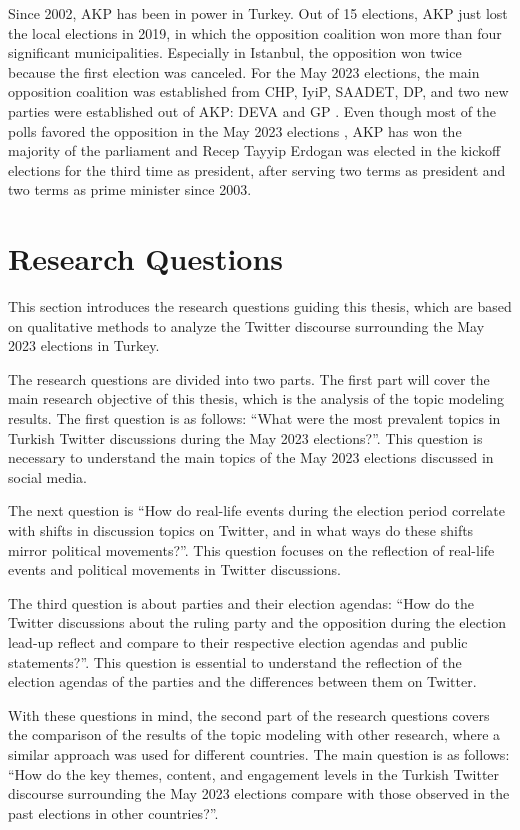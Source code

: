 Since 2002, \ac{AKP} has been in power in Turkey. Out of 15 elections, \ac{AKP} just lost the 
local elections in 2019, in which the opposition coalition won more than four significant municipalities. 
Especially in Istanbul, the opposition won twice because the first election was canceled. 
For the May 2023 elections, the main opposition coalition was established from \ac{CHP}, \ac{IyiP}, \ac{SAADET}, 
\ac{DP}, and two new parties were established out of \ac{AKP}: \ac{DEVA} and \ac{GP} 
\parencite{Atila_medyascope_tr_secim_tarihi_2022}. 
Even though most of the polls favored the opposition in the May 2023 elections 
\parencite{Saç_Çoban_teyit_anketler_2023}, \ac{AKP} has won the majority of the parliament and 
Recep Tayyip Erdogan was elected in the kickoff elections for the third time as president, after serving 
two terms as president and two terms as prime minister since 2003.
\section{Research Questions}

This section introduces the research questions guiding this thesis,
which are based on qualitative methods to analyze the Twitter discourse surrounding the May 2023 elections in Turkey.


The research questions are divided into two parts.
The first part will cover the main research objective of this thesis, 
which is the analysis of the topic modeling results. The first question is as follows:
``What were the most prevalent topics in Turkish Twitter discussions during the May 2023 elections?''.
This question is necessary to understand the main topics of the May 2023 elections discussed in social media.

The next question is ``How do real-life events during the election period correlate with shifts in discussion topics on Twitter, 
and in what ways do these shifts mirror political movements?''.
This question focuses on the reflection of real-life events and political movements in Twitter discussions. 

The third question is about parties and their election agendas: 
``How do the Twitter discussions about the ruling party and the opposition during the election lead-up reflect and compare 
to their respective election agendas and public statements?''.
This question is essential to understand the reflection of the election agendas of the parties and the differences between them on Twitter.

With these questions in mind, the second part of the research questions covers the comparison of the results of the topic modeling
with other research, where a similar approach was used for different countries.
The main question is as follows: 
``How do the key themes, content, and engagement levels in the Turkish Twitter discourse surrounding the May 2023 elections
 compare with those observed in the past elections in other countries?''.
